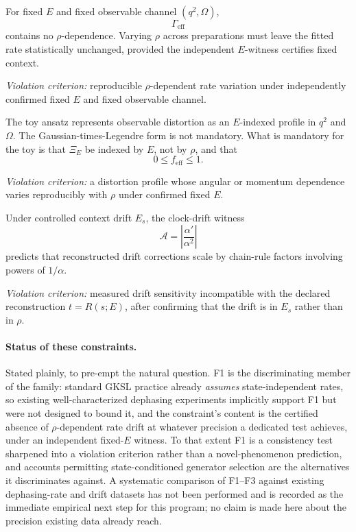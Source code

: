 \documentclass[aps,prx,onecolumn,11pt]{revtex4-2}
\theoremstyle{plain}
\theoremstyle{definition}
\theoremstyle{remark}
\begin{document}
\begin{description}[leftmargin=2em, style=nextline]

\item[F1. Rate-independence under state variation.]
For fixed \(E\) and fixed observable channel \((q^2,\Omega)\),
\[
\Gamma_{\mathrm{eff}}
\]
contains no \(\rho\)-dependence. Varying \(\rho\) across preparations
must leave the fitted rate statistically unchanged, provided the
independent \(E\)-witness certifies fixed context.

\textit{Violation criterion:} reproducible \(\rho\)-dependent rate
variation under independently confirmed fixed \(E\) and fixed observable
channel.

\item[F2. \(E\)-indexed distortion profile.]
The toy ansatz represents observable distortion as an \(E\)-indexed
profile in \(q^2\) and \(\Omega\). The Gaussian-times-Legendre form is
not mandatory. What is mandatory for the toy is that \(\Xi_E\) be
indexed by \(E\), not by \(\rho\), and that
\[
0\leq f_{\mathrm{eff}}\leq1.
\]

\textit{Violation criterion:} a distortion profile whose angular or
momentum dependence varies reproducibly with \(\rho\) under confirmed
fixed \(E\).

\item[F3. Drift-amplification scaling.]
Under controlled context drift \(E_s\), the clock-drift witness
\[
\mathcal A=\left|\frac{\alpha'}{\alpha^2}\right|
\]
predicts that reconstructed drift corrections scale by chain-rule
factors involving powers of \(1/\alpha\).

\textit{Violation criterion:} measured drift sensitivity incompatible
with the declared reconstruction \(t=R(s;E)\), after confirming that the
drift is in \(E_s\) rather than in \(\rho\).

\end{description}

\paragraph{Status of these constraints.}
Stated plainly, to pre-empt the natural question. F1 is the
discriminating member of the family: standard GKSL practice already
\emph{assumes} state-independent rates, so existing well-characterized
dephasing experiments implicitly support F1 but were not designed to
bound it, and the constraint's content is the certified absence of
\(\rho\)-dependent rate drift at whatever precision a dedicated test
achieves, under an independent fixed-\(E\) witness. To that extent F1
is a consistency test sharpened into a violation criterion rather than
a novel-phenomenon prediction, and accounts permitting
state-conditioned generator selection are the alternatives it
discriminates against. A systematic comparison of F1--F3 against
existing dephasing-rate and drift datasets has not been performed and
is recorded as the immediate empirical next step for this program; no
claim is made here about the precision existing data already reach.
\end{document}
